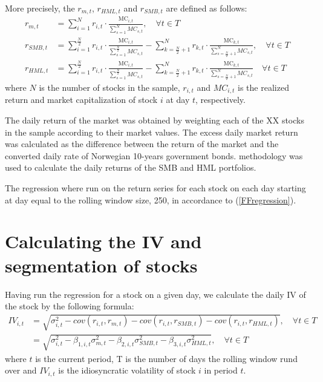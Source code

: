 More precisely, the $r_{m,t}$, $r_{HML,t}$ and $r_{SMB,t}$ are defined as follows:
\begin{align}
    r_{m,t} &= \sum_{i=1}^{N} r_{i,t} \cdot \frac{\text{MC}_{i,t}}{\sum_{s=1}^{N} MC_{s,t}},  \quad  \forall t \in T \\
    r_{SMB,t} &= \sum_{i=1}^{\frac{N}{2}} r_{i,t} \cdot \frac{\text{MC}_{i,t}}{\sum_{s=1}^{\frac{N}{2}} MC_{s,t}} - \sum_{k=\frac{N}{2}+1}^{N} r_{k,t} \cdot \frac{\text{MC}_{k,t}}{\sum_{s={\frac{N}{2}+1}}^{N} MC_{s,t}}, \quad  \forall t \in T \\
    r_{HML,t} &= \sum_{i=1}^{\frac{N}{2}} r_{i,t} \cdot \frac{\text{MC}_{i,t}}{\sum_{s=1}^{\frac{N}{2}} MC_{s,t}} - \sum_{k=\frac{N}{2}+1}^{N} r_{k,t} \cdot \frac{\text{MC}_{k,t}}{\sum_{s=\frac{N}{2}+1}^{N} MC_{s,t}} \quad  \forall t \in T
\end{align}
where $N$ is the number of stocks in the sample, $r_{i,t}$ and $MC_{i,t}$ is the realized return and market capitalization of stock $i$ at day $t$, respectively. 

The daily return of the market was obtained by weighting each of the XX stocks in the sample according to their market values. The excess daily market return was calculated as the difference between the return of the market and the converted daily rate of Norwegian 10-years government bonds. \cite{famafrench} methodology was used to calculate the daily returns of the SMB and HML portfolios.

The regression where run on the return series for each stock on each day starting at day equal to the rolling window size, 250, in accordance to (\ref{FFregression}). 

\section*{Calculating the IV and segmentation of stocks}
Having run the regression for a stock on a given day, we calculate the daily IV of the stock by the following formula:
 \begin{align}
    IV_{i,t} &= \sqrt{\sigma_{i,t}^{2} - cov(r_{i,t},r_{m,t}) - cov(r_{i,t},r_{SMB,t}) - cov(r_{i,t},r_{HML,t})}, \quad \forall t \in T \\
    &= \sqrt{\sigma_{i,t}^2 - \beta_{1,i,t} \sigma_{m,t}^{2}- \beta_{2,i,t} \sigma_{SMB,t}^{2}- \beta_{3,i,t} \sigma_{HML,t}^{2}}, \quad \forall t \in T
\end{align}
where $t$ is the current period, T is the number of days the rolling window rund over and $IV_{i,t}$ is the idiosyncratic volatility of stock $i$ in period $t$.

